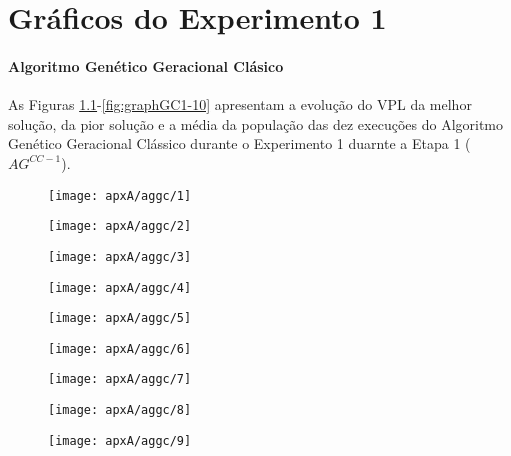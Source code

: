 \chapter{Gráficos do Experimento 1}

\subsubsection{Algoritmo Genético Geracional Clásico}
As Figuras \ref{fig:graphGC1-01}-\ref{fig:graphGC1-10} apresentam a evolução do VPL da melhor solução, da pior solução e a média da população das dez execuções do Algoritmo Genético Geracional Clássico durante o Experimento 1 duarnte a Etapa 1 ($AG^{CC-1}$).

\begin{figure}[H]
\centering
\label{fig:graphGC1-01}
\texttt{[image: apxA/aggc/1]}
\end{figure}

\begin{figure}[H]
\centering
\texttt{[image: apxA/aggc/2]}
\end{figure}

\begin{figure}[H]
\centering
\texttt{[image: apxA/aggc/3]}
\end{figure}

\begin{figure}[H]
\centering

\texttt{[image: apxA/aggc/4]}
\end{figure}
\begin{figure}[htb]
\centering
\texttt{[image: apxA/aggc/5]}
\end{figure}


\begin{figure}[H]
\centering

\texttt{[image: apxA/aggc/6]}
\end{figure}

\begin{figure}[H]
\centering

\texttt{[image: apxA/aggc/7]}
\end{figure}

\begin{figure}[H]
\centering

\texttt{[image: apxA/aggc/8]}
\end{figure}

\begin{figure}[H]
\centering

\texttt{[image: apxA/aggc/9]}
\end{figure}


